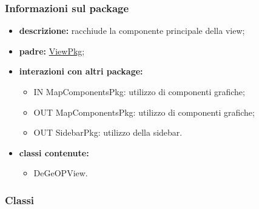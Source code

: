 \subsubsection{Informazioni sul package}
\begin{itemize}
	\item \textbf{descrizione:} racchiude la componente principale della view;
	\item \textbf{padre:} \hyperref[pkg::ViewPkg]{ViewPkg};
	\item \textbf{interazioni con altri package:} 
	\begin{itemize}
		\item IN MapComponentsPkg: utilizzo di componenti grafiche;
		\item OUT MapComponentsPkg: utilizzo di componenti grafiche;
		\item OUT SidebarPkg: utilizzo della sidebar.
	\end{itemize}
	\item \textbf{classi contenute:}
	\begin{itemize}
		\item DeGeOPView.
	\end{itemize}
\end{itemize}
\subsubsection{Classi}
